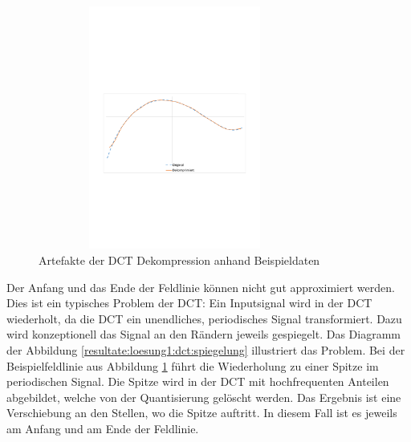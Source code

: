 \begin{figure}[!htbp]
	\center
	\includegraphics[trim = 1.8cm 9.8cm 1.8cm 11.2cm, clip=true, width=0.8\textwidth,height=8cm,keepaspectratio]{./pictures/resultate/loesung1/loesung1-0/loesung1_0_artefakte.pdf}
	\caption{Artefakte der DCT Dekompression anhand Beispieldaten}
	\label{resultate:loesung1:dct:artefakte}
\end{figure}
Der Anfang und das Ende der Feldlinie können nicht gut approximiert werden. Dies ist ein typisches Problem der DCT: Ein Inputsignal wird in der DCT wiederholt, da die DCT  ein unendliches, periodisches Signal transformiert. Dazu wird konzeptionell das Signal an den Rändern jeweils gespiegelt. Das Diagramm der Abbildung \ref{resultate:loesung1:dct:spiegelung} illustriert das Problem. Bei der Beispielfeldlinie aus Abbildung \ref{resultate:loesung1:dct:artefakte} führt die Wiederholung zu einer Spitze im periodischen Signal. Die Spitze wird in der DCT mit hochfrequenten Anteilen abgebildet, welche von der Quantisierung gelöscht werden. Das Ergebnis ist eine Verschiebung an den Stellen, wo die Spitze auftritt. In diesem Fall ist es jeweils am Anfang und am Ende der Feldlinie.

